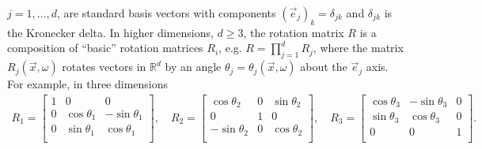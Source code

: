 \documentclass[11pt]{amsart}
\begin{document}
$j=1,\ldots,d$, are standard basis vectors with components
$(\vec{e}_j)_k=\delta_{jk}$ and $\delta_{jk}$ is the Kronecker delta. In higher
dimensions, $d\geq3$, the rotation matrix $R$ is a composition of
``basic'' rotation matrices 
$R_i$, e.g. $R=\prod_{j=1}^dR_j$, where the matrix $R_j(\vec{x},\omega)$
rotates vectors in $\mathbb{R}^d$ by an angle
$\theta_j=\theta_j(\vec{x},\omega)$ about the $\vec{e}_j$ axis. For example, in three
dimensions 
%
\begin{align}\label{eq:polycrystal_parameters_3D}
  R_1=
  \left[
  \begin{array}{ccc}
    1     &0     &    0\\
    0     &\cos\theta_1 & -\sin\theta_1\\
    0     &\sin\theta_1 & \cos\theta_1\\
    \end{array}
    \right],
    \quad
   R_2=
  \left[
  \begin{array}{ccc}
    \cos\theta_2  & 0     &\sin\theta_2 \\
    0      & 1     & 0\\
    -\sin\theta_2 & 0     &\cos\theta_2\\
    \end{array}
    \right],
    \quad
    R_3=
  \left[
  \begin{array}{ccc}
    \cos\theta_3 & -\sin\theta_3 & 0\\
    \sin\theta_3 & \cos\theta_3  & 0\\
    0     & 0      & 1\\
    \end{array}
    \right].
\end{align}
%
\end{document}
